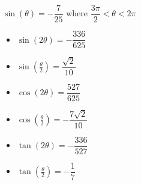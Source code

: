 {$\sin(\theta) = -\dfrac{7}{25}$ where $\dfrac{3\pi}{2} < \theta < 2\pi$}
{\begin{itemize}
\item $\sin(2\theta) = -\dfrac{336}{625}$
\item $\sin\left(\frac{\theta}{2}\right) = \dfrac{\sqrt{2}}{10}$
\item $\cos(2\theta) = \dfrac{527}{625}$
\item $\cos\left(\frac{\theta}{2}\right) = -\dfrac{7\sqrt{2}}{10}$
\item $\tan(2\theta) = -\dfrac{336}{527}$
\item $\tan\left(\frac{\theta}{2}\right) = -\dfrac{1}{7}$
\end{itemize}}
